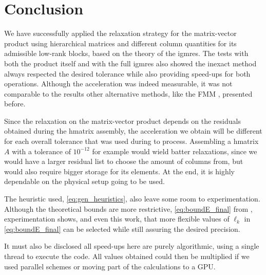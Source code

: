 \clearpage
\section{Conclusion}

We have successfully applied the relaxation strategy for the matrix-vector product using hierarchical matrices and different column quantities for its admissible low-rank blocks, based on the theory of the \acrfull{igmres}. The tests with both the product itself and with the full \acrshort{igmres} also showed the inexact method always respected the desired tolerance while also providing speed-ups for both operations. Although the acceleration was indeed measurable, it was not comparable to the results other alternative methods, like the FMM \cite{wang2016inexactkryloviterationsrelaxation}, presented before.

Since the relaxation on the matrix-vector product depends on the residuals obtained during the \acrshort{hmatrix} assembly, the acceleration we obtain will be different for each overall tolerance that was used during to process. Assembling a \acrshort{hmatrix} $A$ with a tolerance of $10^{-12}$ for example would wield batter relaxations, since we would have a larger residual list to choose the amount of columns from, but would also require bigger storage for its elements. At the end, it is highly dependable on the physical setup going to be used.

The heuristic used, \ref{eq:gen_heuristics}, also leave some room to experimentation. Although the theoretical bounds are more restrictive, \ref{eq:boundE_final} from \cite{simoncini2003theory}, experimentation shows, \cite{wang2016inexactkryloviterationsrelaxation} and even this work, that more flexible values of $\ell_{k}$ in \autoref{eq:boundE_final} can be selected while still assuring the desired precision.

It must also be disclosed all speed-ups here are purely algorithmic, using a single thread to execute the code. All values obtained could then be multiplied if we used parallel schemes or moving part of the calculations to a GPU.

